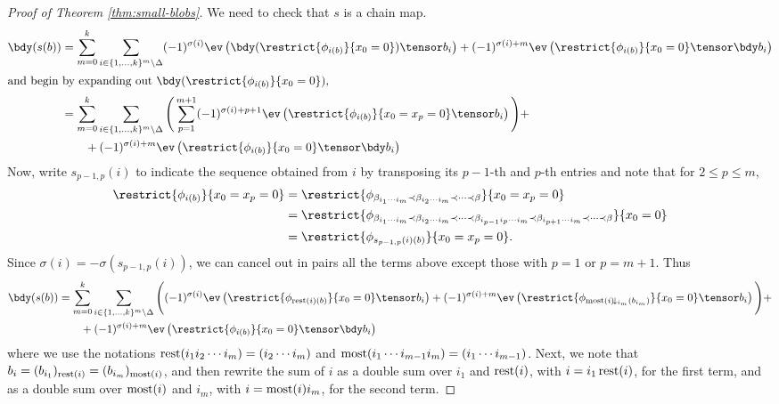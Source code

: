 \begin{proof}[Proof of Theorem \ref{thm:small-blobs}]
We need to check that $s$ is a chain map.
\begin{align*}
\bdy(s(b)) & = \sum_{m=0}^{k} \sum_{i \in \{1, \ldots, k\}^{m} \setminus \Delta} (-1)^{\sigma(i)} \ev\left(\bdy(\restrict{\phi_{i(b)}}{x_0 = 0})\tensor b_i\right) + (-1)^{\sigma(i) + m} \ev\left(\restrict{\phi_{i(b)}}{x_0 = 0} \tensor \bdy b_i\right) \\
\intertext{and begin by expanding out $\bdy(\restrict{\phi_{i(b)}}{x_0 = 0})$,}
	& = \sum_{m=0}^{k} \sum_{i \in \{1, \ldots, k\}^{m} \setminus \Delta} \Bigg(\sum_{p=1}^{m+1} (-1)^{\sigma(i)+p+1} \ev\left(\restrict{\phi_{i(b)}}{x_0 = x_p = 0}\tensor b_i\right) \Bigg) + \\
	& \qquad + (-1)^{\sigma(i) + m} \ev\left(\restrict{\phi_{i(b)}}{x_0 = 0} \tensor \bdy b_i\right)
\end{align*}
Now, write $s_{p-1,p}(i)$ to indicate the sequence obtained from $i$ by transposing its $p-1$-th and $p$-th entries and note that for $2 \leq p \leq m$,
\begin{align*}
\restrict{\phi_{i(b)}}{x_0=x_p=0} & = \restrict{\phi_{\beta_{i_1\cdots i_m} \prec \beta_{i_2 \cdots i_m} \prec \cdots \prec \beta}}{x_0=x_p=0} \\
	& = \restrict{\phi_{\beta_{i_1\cdots i_m} \prec \beta_{i_2 \cdots i_m} \prec \cdots \prec \beta_{i_{p-1} i_p \cdots i_m} \prec \beta_{i_{p+1} \cdots i_m} \prec \cdots \prec \beta}}{x_0=0} \\
	& = \restrict{\phi_{s_{p-1,p}(i)(b)}}{x_0=x_p=0}.
\end{align*}
Since $\sigma(i) = - \sigma(s_{p-1,p}(i))$, we can cancel out in pairs all the terms above except those with $p=1$ or $p=m+1$. Thus
\begin{align*}
\bdy(s(b)) & = \sum_{m=0}^{k} \sum_{i \in \{1, \ldots, k\}^{m} \setminus \Delta} \Bigg((-1)^{\sigma(i)} \ev\left(\restrict{\phi_{\rest(i)(b)}}{x_0 = 0}\tensor b_i\right) + (-1)^{\sigma(i) + m} \ev\left(\restrict{\phi_{\most(i)\!\downarrow_{i_m}(b_{i_m})}}{x_0 = 0}\tensor b_i\right)\Bigg) + \\
	& \qquad + (-1)^{\sigma(i) + m} \ev\left(\restrict{\phi_{i(b)}}{x_0 = 0} \tensor \bdy b_i\right)
\end{align*}
where we use the notations $\operatorname{rest}(i_1 i_2 \cdots i_m) = (i_2 \cdots i_m)$ and $\operatorname{most}(i_1 \cdots i_{m-1} i_m) = (i_1 \cdots i_{m-1})$. Next, we note that $b_i = (b_{i_1})_{\operatorname{rest}(i)} = (b_{i_m})_{\operatorname{most}(i)}$, and then rewrite the sum of $i$ as a double sum over $i_1$ and $\operatorname{rest}(i)$, with $i = i_1\operatorname{rest}(i)$, for the first term, and as a double sum over $\operatorname{most}(i)$ and $i_m$, with $i = \operatorname{most}(i)i_m$, for the second term.

\end{proof}
